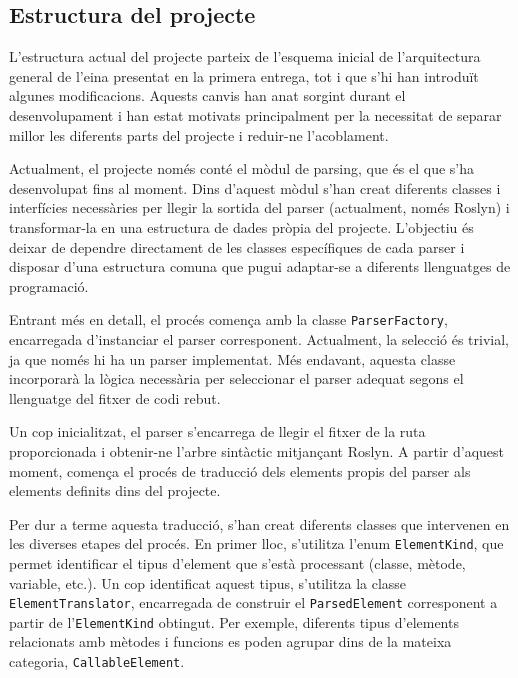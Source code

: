 

\subsection*{Estructura del projecte}

L'estructura actual del projecte parteix de l'esquema inicial de l'arquitectura general de l'eina presentat en la primera entrega, tot i que s'hi han introduït algunes modificacions. Aquests canvis han anat sorgint durant el desenvolupament i han estat motivats principalment per la necessitat de separar millor les diferents parts del projecte i reduir-ne l'acoblament.

Actualment, el projecte només conté el mòdul de parsing, que és el que s'ha desenvolupat fins al moment. Dins d'aquest mòdul s'han creat diferents classes i interfícies necessàries per llegir la sortida del parser (actualment, només Roslyn) i transformar-la en una estructura de dades pròpia del projecte. L'objectiu és deixar de dependre directament de les classes específiques de cada parser i disposar d'una estructura comuna que pugui adaptar-se a diferents llenguatges de programació.

Entrant més en detall, el procés comença amb la classe \texttt{ParserFactory}, encarregada d'instanciar el parser corresponent. Actualment, la selecció és trivial, ja que només hi ha un parser implementat. Més endavant, aquesta classe incorporarà la lògica necessària per seleccionar el parser adequat segons el llenguatge del fitxer de codi rebut.

Un cop inicialitzat, el parser s'encarrega de llegir el fitxer de la ruta proporcionada i obtenir-ne l'arbre sintàctic mitjançant Roslyn. A partir d'aquest moment, comença el procés de traducció dels elements propis del parser als elements definits dins del projecte.

Per dur a terme aquesta traducció, s'han creat diferents classes que intervenen en les diverses etapes del procés. En primer lloc, s'utilitza l'enum \texttt{ElementKind}, que permet identificar el tipus d'element que s'està processant (classe, mètode, variable, etc.). Un cop identificat aquest tipus, s'utilitza la classe \texttt{ElementTranslator}, encarregada de construir el \texttt{ParsedElement} corresponent a partir de l'\texttt{ElementKind} obtingut. Per exemple, diferents tipus d'elements relacionats amb mètodes i funcions es poden agrupar dins de la mateixa categoria, \texttt{CallableElement}.

